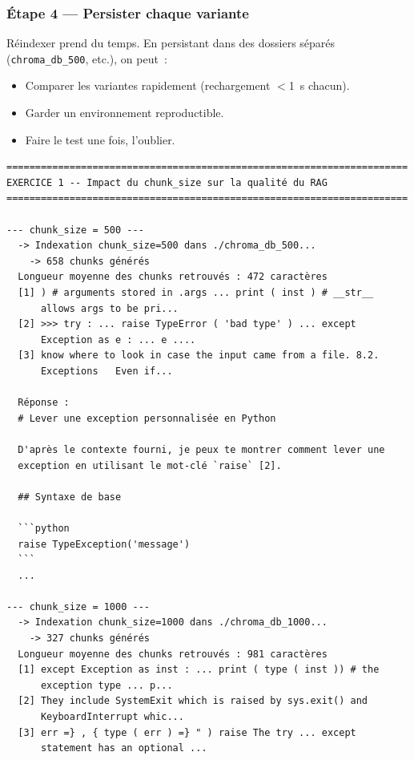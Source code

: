 \documentclass[11pt,a4paper]{article}
\begin{document}
\subsubsection*{Étape 4 — Persister chaque variante}

Réindexer prend du temps. En persistant dans des dossiers séparés
(\texttt{chroma\_db\_500}, etc.), on peut~:
\begin{itemize}[leftmargin=*]
  \item Comparer les variantes rapidement (rechargement $<$1~s chacun).
  \item Garder un environnement reproductible.
  \item Faire le test une fois, l'oublier.
\end{itemize}

\begin{tcolorbox}[
  colback=white,
  colframe=black!50,
  coltitle=black,
  fonttitle=\footnotesize\bfseries,
  fontupper=\footnotesize,
  title=Sortie de l'exécution,
  breakable,
]
\begin{verbatim}
======================================================================
EXERCICE 1 -- Impact du chunk_size sur la qualité du RAG
======================================================================

--- chunk_size = 500 ---
  -> Indexation chunk_size=500 dans ./chroma_db_500...
    -> 658 chunks générés
  Longueur moyenne des chunks retrouvés : 472 caractères
  [1] ) # arguments stored in .args ... print ( inst ) # __str__
      allows args to be pri...
  [2] >>> try : ... raise TypeError ( 'bad type' ) ... except
      Exception as e : ... e ....
  [3] know where to look in case the input came from a file. 8.2.
      Exceptions   Even if...

  Réponse :
  # Lever une exception personnalisée en Python

  D'après le contexte fourni, je peux te montrer comment lever une
  exception en utilisant le mot-clé `raise` [2].

  ## Syntaxe de base

  ```python
  raise TypeException('message')
  ```
  ...

--- chunk_size = 1000 ---
  -> Indexation chunk_size=1000 dans ./chroma_db_1000...
    -> 327 chunks générés
  Longueur moyenne des chunks retrouvés : 981 caractères
  [1] except Exception as inst : ... print ( type ( inst )) # the
      exception type ... p...
  [2] They include SystemExit which is raised by sys.exit() and
      KeyboardInterrupt whic...
  [3] err =} , { type ( err ) =} " ) raise The try ... except
      statement has an optional ...


\end{verbatim}
\end{tcolorbox}
\end{document}
